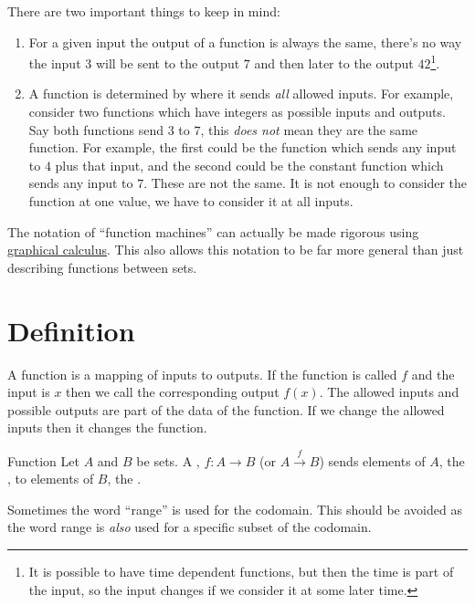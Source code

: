 \documentclass[fleqn]{LectureClass/LectureClass}
\begin{document}
    There are two important things to keep in mind:
    \begin{enumerate}
        \item For a given input the output of a function is always the same, there's no way the input \(3\) will be sent to the output \(7\) and then later to the output \(42\)\footnote{It is possible to have time dependent functions, but then the time is part of the input, so the input changes if we consider it at some later time.}.
        \item A function is determined by where it sends \emph{all} allowed inputs. For example, consider two functions which have integers as possible inputs and outputs.
        Say both functions send \(3\) to \(7\), this \emph{does not} mean they are the same function.
        For example, the first could be the function which sends any input to \(4\) plus that input, and the second could be the constant function which sends any input to \(7\).
        These are not the same.
        It is not enough to consider the function at one value, we have to consider it at all inputs.
    \end{enumerate}
    
    \begin{remark}{}{}
        The notation of \enquote{function machines} can actually be made rigorous using \href{https://academic.oup.com/book/43710/chapter/367235318}{graphical calculus}.
        This also allows this notation to be far more general than just describing functions between sets.
    \end{remark}
    
    \section{Definition}
    A function is a mapping of inputs to outputs.
    If the function is called \(f\) and the input is \(x\) then we call the corresponding output \(f(x)\).
    The allowed inputs and possible outputs are part of the data of the function.
    If we change the allowed inputs then it changes the function.
    
    \begin{dfn}{Function}{}
        Let \(A\) and \(B\) be sets.
        A , \(f \colon A \to B\) (or \(A \xrightarrow{f} B\)) sends elements of \(A\), the , to elements of \(B\), the .
    \end{dfn}
    
    \begin{wrn}
        Sometimes the word \enquote{range} is used for the codomain.
        This should be avoided as the word range is \emph{also} used for a specific subset of the codomain.
    \end{wrn}
    
\end{document}
